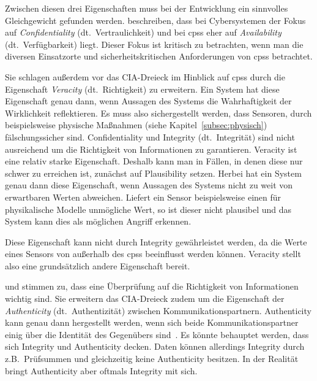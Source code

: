 \documentclass[final,bibliography=totocnumbered]{include/sikseminar}
\newcommand{\cps}{\glspl{cps}\xspace}
\begin{document}
Zwischen diesen drei Eigenschaften muss bei der Entwicklung ein sinnvolles Gleichgewicht gefunden werden.
\citeauthor{GK16} beschreiben, dass bei Cybersystemen der Fokus auf \textit{Confidentiality} (dt.\ Vertraulichkeit) und bei \cps eher auf \textit{Availability} (dt.\ Verfügbarkeit) liegt.
Dieser Fokus ist kritisch zu betrachten, wenn man die diversen Einsatzorte und sicherheitskritischen Anforderungen von \cps betrachtet.

Sie schlagen außerdem vor das CIA-Dreieck im Hinblick auf \cps durch die Eigenschaft \textit{Veracity} (dt.~Richtigkeit) zu erweitern.
Ein System hat diese Eigenschaft genau dann, wenn Aussagen des Systems die Wahrhaftigkeit der  Wirklichkeit reflektieren.
Es muss also sichergestellt werden, dass Sensoren, durch beispielsweise physische Maßnahmen (siehe Kapitel~\ref{subsec:physisch}) fälschungssicher sind.
Confidentiality und Integrity (dt.\ Integrität) sind nicht ausreichend um die Richtigkeit von Informationen zu garantieren.
Veracity ist eine relativ starke Eigenschaft.
Deshalb kann man in Fällen, in denen diese nur schwer zu erreichen ist, zunächst auf Plausibility setzen.
Herbei hat ein System genau dann diese Eigenschaft, wenn Aussagen des Systems nicht zu weit von erwartbaren Werten abweichen.
Liefert ein Sensor beispielsweise einen für physikalische Modelle unmögliche Wert, so ist dieser nicht plausibel und das System kann dies als möglichen Angriff erkennen.~\cite{GK16}

Diese Eigenschaft kann nicht durch Integrity gewährleistet werden, da die Werte eines Sensors von außerhalb des \cps beeinflusst werden können.
Veracity stellt also eine grundsätzlich andere Eigenschaft bereit.

\citeauthor{WYX+10} und \citeauthor{SFJ17} stimmen zu, dass eine Überprüfung auf die Richtigkeit von Informationen wichtig sind.
Sie erweitern das CIA-Dreieck zudem um die Eigenschaft der \textit{Authenticity} (dt.\ Authentizität) zwischen Kommunikationspartnern.
Authenticity kann genau dann hergestellt werden, wenn sich beide Kommunikationspartner einig über die Identität des Gegenübers sind~\cite{CH13}.
Es könnte behauptet werden, dass sich Integrity und Authenticity decken.
Daten können allerdings Integrity durch z.B.\ Prüfsummen und gleichzeitig keine Authenticity besitzen.
In der Realität bringt Authenticity aber oftmals Integrity mit sich.
\end{document}
